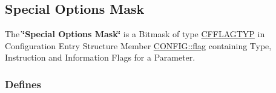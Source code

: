 \hypertarget{group__special__options__mask}{
\subsection{Special Options Mask}
\label{group__special__options__mask}
}
The {\bf \char`\"{}Special Options Mask\char`\"{}} is a Bitmask of type \hyperlink{group__special__options__mask_g4854f1596d5c6e0604a478fa9a2e23f0}{CFFLAGTYP} in Configuration Entry Structure Member \hyperlink{struct_c_o_n_f_i_g_b04d08abdf758c0400caaded716f4089}{CONFIG::flag} containing Type, Instruction and Information Flags for a Parameter.  


\subsubsection*{Defines}
